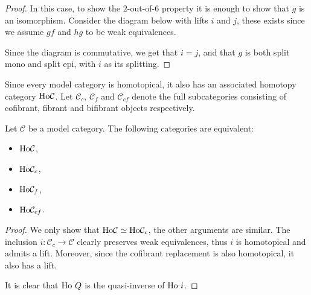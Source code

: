 \documentclass[../thesis.tex]{subfiles}
\begin{document}
\begin{proof}
                In this case, to show the $2$-out-of-$6$ property it is enough to show that $g$ is an isomorphism. Consider the diagram below with lifts $i$ and $j$, these exists since we assume $gf$ and $hg$ to be weak equivalences.
                \begin{center}
                \end{center}
                Since the diagram is commutative, we get that $i = j$, and that $g$ is both split mono and split epi, with $i$ as its splitting.
            \end{proof}

            Since every model category is homotopical, it also has an associated homotopy category $\tt{Ho}\mathcal{C}$. Let $\mathcal{C}_c$, $\mathcal{C}_f$ and $\mathcal{C}_{cf}$ denote the full subcategories consisting of cofibrant, fibrant and bifibrant objects respectively.

            \begin{proposition}
                Let $\mathcal{C}$ be a model category. The following categories are equivalent:
                \begin{itemize}
                    \item $\tt{Ho}\mathcal{C}$,
                    \item $\tt{Ho}\mathcal{C}_c$,
                    \item $\tt{Ho}\mathcal{C}_f$,
                    \item $\tt{Ho}\mathcal{C}_{cf}$.
                \end{itemize}
            \end{proposition}

            \begin{proof}
                We only show that $\tt{Ho}\mathcal{C} \simeq \tt{Ho}\mathcal{C}_c$, the other arguments are similar. The inclusion $i:\mathcal{C}_c\rightarrow \mathcal{C}$ clearly preserves weak equivalences, thus $i$ is homotopical and admits a lift. Moreover, since the cofibrant replacement is also homotopical, it also has a lift.

                \begin{center}
                \end{center}

                It is clear that $\tt{Ho}\ Q$ is the quasi-inverse of $\tt{Ho}\ i$.
            \end{proof}
\end{document}
